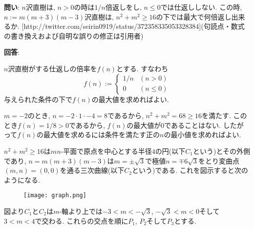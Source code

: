 \documentclass[11pt,a4paper,twocolumn]{jsarticle}
\begin{document}
{\bf 問い}: $n$沢直樹は, $n>0$の時は$1/n$倍返しをし, $n \le 0$では仕返ししない. この時, $n := m(m+3)(m-3)$沢直樹は, $n^2+m^2 \ge 16$の下では最大で何倍返し出来るか. [http://\allowbreak{}twitter.com/seirin0919/status/372358335053\allowbreak{}328384](句読点・数式の書き換えおよび自明な誤りの修正は引用者)

\bigskip

{\bf 回答}:

\smallskip
\noindent $n$沢直樹がする仕返しの倍率を$f(n)$とする.
すなわち
\[ f(n) := \begin{cases}
  1 / n & (n > 0) \\
  0 & (n \le 0)
\end{cases} \]
与えられた条件の下で$f(n)$の最大値を求めればよい.

$m = -2$のとき, $n = -2 \cdot 1 \cdot -4 = 8$であるから, $n^2 + m^2 = 68 \ge 16$を満たす.
このとき$f(n) = 1/8 > 0$であるから, $f(n)$の最大値が$0$であることはない.
したがって$f(n)$の最大値を求めるには条件を満たす正の$n$の最小値を求めればよい.

$n^2 + m^2 \ge 16$は$mn$-平面で原点を中心とする半径$4$の円(以下$C_1$という)とその外側であり,
$n = m(m+3)(m-3)$は$m = \pm \sqrt 3$で極値$n = \mp 6 \sqrt 3$をとり変曲点$(m, n) = (0, 0)$を通る三次曲線(以下$C_2$という)である.
これを図示すると次のようになる.
\begin{figure}[h]
  \begin{center}
    \texttt{[image: graph.png]}
  \end{center}
\end{figure}

図より$C_1$と$C_2$は$m$-軸より上では$-3 < m < - \sqrt 3$, $- \sqrt 3 < m < 0$そして$3 < m < 4$で交わる.
これらの交点を順に$P_1$, $P_2$そして$P_3$とする.
\end{document}
